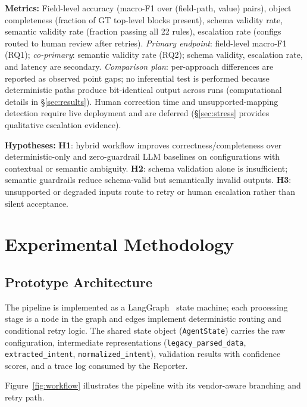 \documentclass[conference]{IEEEtran}
\begin{document}
\textbf{Metrics:} Field-level accuracy (macro-F1 over (field-path, value) pairs), object completeness (fraction of GT top-level blocks present), schema validity rate, semantic validity rate (fraction passing all 22 rules), escalation rate (configs routed to human review after retries). \emph{Primary endpoint}: field-level macro-F1 (RQ1); \emph{co-primary}: semantic validity rate (RQ2); schema validity, escalation rate, and latency are secondary. \emph{Comparison plan}: per-approach differences are reported as observed point gaps; no inferential test is performed because deterministic paths produce bit-identical output across runs (computational details in §\ref{sec:results}). Human correction time and unsupported-mapping detection require live deployment and are deferred (§\ref{sec:stress} provides qualitative escalation evidence).

\textbf{Hypotheses:} \textbf{H1}: hybrid workflow improves correctness/completeness over deterministic-only and zero-guardrail LLM baselines on configurations with contextual or semantic ambiguity. \textbf{H2}: schema validation alone is insufficient; semantic guardrails reduce schema-valid but semantically invalid outputs. \textbf{H3}: unsupported or degraded inputs route to retry or human escalation rather than silent acceptance.

\section{Experimental Methodology}

\subsection{Prototype Architecture}

The pipeline is implemented as a LangGraph~\cite{langchain2024langgraph} state machine; each processing stage is a node in the graph and edges implement deterministic routing and conditional retry logic. The shared state object (\texttt{AgentState}) carries the raw configuration, intermediate representations (\texttt{legacy\_parsed\_data}, \texttt{extracted\_intent}, \texttt{normalized\_intent}), validation results with confidence scores, and a trace log consumed by the Reporter.

Figure~\ref{fig:workflow} illustrates the pipeline with its vendor-aware branching and retry path.
\end{document}

